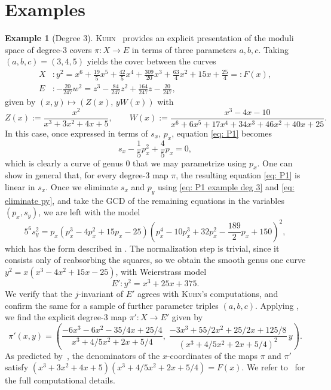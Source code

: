 \documentclass[a4paper,twoside,english]{amsart}
\theoremstyle{plain}
\theoremstyle{definition}
\newtheorem{example}[theorem]{Example}
\begin{document}
\section{Examples}
\begin{example}[Degree 3]
\label{example: degree 3}
\textsc{Kuhn}~\cite[\S 6]{Kuhn} provides an explicit presentation of the moduli space of degree-$3$
covers $\pi \colon X \to E$ in terms of three parameters $a, b, c$. Taking $(a,b,c) = (3,4,5)$
yields the cover between the curves
\begin{align*}
    X &\colon y^2 = x^6 + \tfrac{19}{5}x^5 + \tfrac{42}{5}x^4 +
    \tfrac{309}{20}x^3 + \tfrac{63}{4}x^2 + 15x + \tfrac{25}{4} =: F(x), \\
    E &\colon -\frac{20}{247} w^2 = z^3 - \tfrac{84}{247}z^2 +
    \tfrac{164}{247}z - \tfrac{20}{247},
\end{align*}
given by $(x,y) \mapsto (Z(x), \, yW(x))$ with
\[
    Z(x) := \frac{x^2}{x^3 + 3x^2 + 4x + 5}, \qquad
    W(x)  :=  \frac{x^3 - 4x - 10}{x^6 + 6x^5 + 17x^4 + 34x^3 + 46x^2 + 40x + 25}.
\]
In this case, once expressed in terms of $s_x,\, p_x$, equation \eqref{eq: P1} becomes
\begin{equation}\label{eq: P1 example deg 3}
s_x - \frac{1}{5} p_x^2 + \frac{4}{5}p_x=0,
\end{equation}
which is clearly a curve of genus $0$ that we may parametrize using $p_x$. One can show in general that, for every degree-$3$ map $\pi$, the resulting equation \eqref{eq: P1} is linear in $s_x$. Once we eliminate $s_x$ and $p_y$ using \eqref{eq: P1 example deg 3} and \eqref{eq: eliminate py}, and take the GCD of the remaining equations in the variables $(p_x, s_y)$, we are left with the model
\[
5^6s_y^2 = p_x(p_x^3-4p_x^2+15p_x-25)(p_x^4 - 10p_x^3 + 32p_x^2 - \frac{189}{2}p_x + 150)^2,
\]
which has the form described in .
The normalization step is trivial, since it consists only of reabsorbing the squares, so we obtain the smooth genus one curve $y^2 = x(x^3-4x^2+15x-25)$, with Weierstrass model
\begin{equation}\label{eq: E prime example}
      E' :  y^2 = x^3 + 25x + 375.
\end{equation}
We verify that the $j$-invariant of $E'$ agrees with \textsc{Kuhn}'s computations, and confirm the same for a sample of further parameter triples $(a,b,c)$. Applying , we find the explicit degree-$3$ map $\pi' : X \to E'$ given by
\[
\pi'(x,y) = \left( \frac{-6x^3 -6x^2 - 35/4x + 25/4}{x^3 + 4/5x^2 + 2x + 5/4}, \; \frac{-3x^3 + 55/2x^2 + 25/2x + 125/8 }{\left(x^3 + 4/5x^2 + 2x + 5/4\right)^2}\, y  \right).
\]
As predicted by~\cite{Kuhn}, the denominators of the $x$-coordinates of the maps $\pi$ and $\pi'$ satisfy $(x^3+3x^2+4x+5)(x^3+4/5x^2+2x+5/4) = F(x)$. We refer to~\cite{repo4} for the full computational details.

\end{example}
\end{document}
